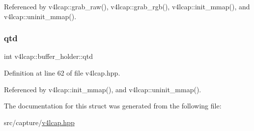 Referenced by v4lcap\+::grab\+\_\+raw(), v4lcap\+::grab\+\_\+rgb(), v4lcap\+::init\+\_\+mmap(), and v4lcap\+::uninit\+\_\+mmap().

\mbox{\label{structv4lcap_1_1buffer__holder_a40424b4a28263425ab1bc05aac1490b4}} 
\subsubsection{\texorpdfstring{qtd}{qtd}}
{\footnotesize\ttfamily int v4lcap\+::buffer\+\_\+holder\+::qtd}



Definition at line 62 of file v4lcap.\+hpp.



Referenced by v4lcap\+::init\+\_\+mmap(), and v4lcap\+::uninit\+\_\+mmap().



The documentation for this struct was generated from the following file\+:\begin{DoxyCompactItemize}
\item 
src/capture/\hyperlink{v4lcap_8hpp}{v4lcap.\+hpp}\end{DoxyCompactItemize}
